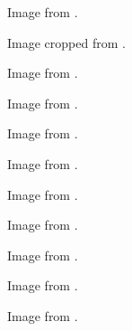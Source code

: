 	\begin{minipage}{\textwidth}
		Image from \cite{tomato}.
	\end{minipage}

	\begin{minipage}{\textwidth}
		Image cropped from \cite{cheese}.
	\end{minipage}

	\begin{minipage}{\textwidth}
		Image from \cite{lettuce}.
	\end{minipage}

	\begin{minipage}{\textwidth}
		Image from \cite{mayonnaise}.
	\end{minipage}

	\begin{minipage}{\textwidth}
		Image from \cite{mustard}.
	\end{minipage}

	\begin{minipage}{\textwidth}
		Image from \cite{ketchup}.
	\end{minipage}

	\begin{minipage}{\textwidth}
		Image from \cite{carrot}.
	\end{minipage}

	\begin{minipage}{\textwidth}
		Image from \cite{peanutButter}.
	\end{minipage}

	\begin{minipage}{\textwidth}
		Image from \cite{jelly}.
	\end{minipage}

	\begin{minipage}{\textwidth}
		Image from \cite{olives}.
	\end{minipage}

	\begin{minipage}{\textwidth}
		Image from \cite{fish}.
	\end{minipage}

